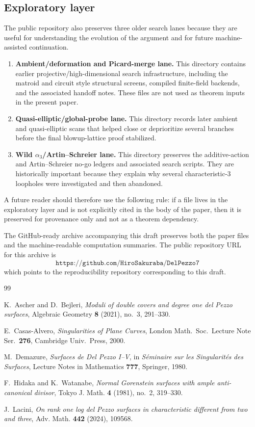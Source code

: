 \documentclass[11pt]{article}
\newcommand{\repourl}{\texttt{https://github.com/HiroSakuraba/DelPezzo7}}
\theoremstyle{definition}
\begin{document}
\subsection*{Exploratory layer}
The public repository also preserves three older search lanes because they are useful for understanding the evolution of the argument and for future machine-assisted continuation.
\begin{enumerate}[label=\textup{(E\arabic*)}]
\item \textbf{Ambient/deformation and Picard-merge lane.} This directory contains earlier projective/high-dimensional search infrastructure, including the matroid and circuit style structural screens, compiled finite-field backends, and the associated handoff notes. These files are not used as theorem inputs in the present paper.
\item \textbf{Quasi-elliptic/global-probe lane.} This directory records later ambient and quasi-elliptic scans that helped close or deprioritize several branches before the final blowup-lattice proof stabilized.
\item \textbf{Wild $\alpha_3$/Artin--Schreier lane.} This directory preserves the additive-action and Artin--Schreier no-go ledgers and associated search scripts. They are historically important because they explain why several characteristic-$3$ loopholes were investigated and then abandoned.
\end{enumerate}

A future reader should therefore use the following rule: if a file lives in the exploratory layer and is not explicitly cited in the body of the paper, then it is preserved for provenance only and not as a theorem dependency.

The GitHub-ready archive accompanying this draft preserves both the paper files and the machine-readable computation summaries. The public repository URL for this archive is
\[
\repourl
\]
which points to the reproducibility repository corresponding to this draft.

\begin{thebibliography}{99}

K.~Ascher and D.~Bejleri,
\emph{Moduli of double covers and degree one del Pezzo surfaces},
Algebraic Geometry \textbf{8} (2021), no.~3, 291--330.

E.~Casas-Alvero,
\emph{Singularities of Plane Curves},
London Math.\ Soc.\ Lecture Note Ser.~\textbf{276}, Cambridge Univ.~Press, 2000.

M.~Demazure,
\emph{Surfaces de Del Pezzo I--V},
in \emph{S\'eminaire sur les Singularit\'es des Surfaces},
Lecture Notes in Mathematics \textbf{777}, Springer, 1980.

F.~Hidaka and K.~Watanabe,
\emph{Normal Gorenstein surfaces with ample anti-canonical divisor},
Tokyo J. Math. \textbf{4} (1981), no.~2, 319--330.

J.~Lacini,
\emph{On rank one log del Pezzo surfaces in characteristic different from two and three},
Adv. Math. \textbf{442} (2024), 109568.

\end{thebibliography}
\end{document}
